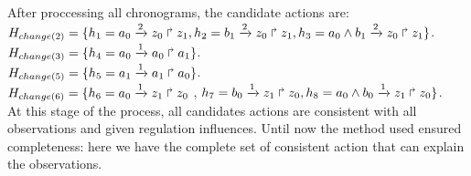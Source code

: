 After proccessing all chronograms, the candidate actions are: \\
$H_{change(2)} = \{ h_1=a_0\xrightarrow{2} z_0 \Rsh z_1,  h_2=b_1\xrightarrow{2} z_0 \Rsh z_1, h_3=a_0 \wedge b_1 \xrightarrow{2} z_0 \Rsh z_1 \}$.\\
$H_{change(3)} = \{ h_4=a_0\xrightarrow{1} a_0 \Rsh a_1  \}$. \\
$H_{change(5)} = \{ h_5=a_1\xrightarrow{1} a_1 \Rsh a_0  \}$. \\
$H_{change(6)} = \{ h_6=a_0\xrightarrow{1} z_1 \Rsh z_0$ , $  h_7=b_0\xrightarrow{1} z_1 \Rsh z_0, h_8=a_0 \wedge b_0 \xrightarrow{1} z_1 \Rsh z_0 \}$. \\

At this stage of the process, all candidates actions are consistent with all observations and given regulation influences.
Until now the method used ensured completeness: here we have the complete set of consistent action that can explain the observations.


